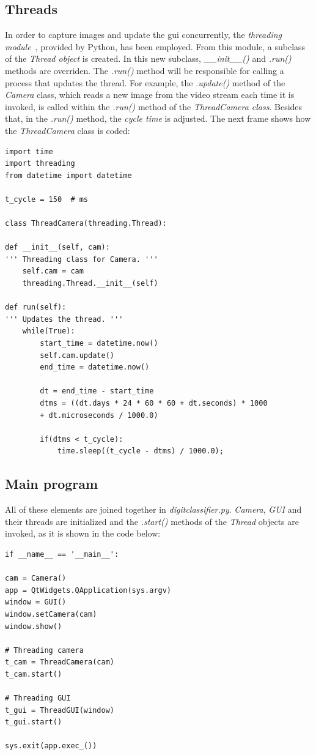 \subsection{Threads} 
In order to capture images and update the \gls{gui} concurrently, the \emph{\textit{threading} module}~\cite{threading}, provided by Python, has been employed. From this module, a subclass of the \emph{\textit{Thread} object} is created. In this new subclass, \textit{\_\_init\_\_()} and \textit{.run()} methods are overriden. The \textit{.run()} method will be responsible for calling a process that updates the thread. For example, the \textit{.update()} method of the \textit{Camera} class, which reads a new image from the video stream each time it is invoked, is called within the \textit{.run()} method of the \emph{\textit{ThreadCamera} class}. Besides that, in the \textit{.run()} method, the \emph{cycle time} is adjusted. The next frame shows how the \textit{ThreadCamera} class is coded:
\begin{lstlisting}
import time
import threading
from datetime import datetime

t_cycle = 150  # ms

class ThreadCamera(threading.Thread):

def __init__(self, cam):
''' Threading class for Camera. '''
	self.cam = cam
	threading.Thread.__init__(self)

def run(self):
''' Updates the thread. '''
	while(True):
		start_time = datetime.now()
		self.cam.update()
		end_time = datetime.now()
		
		dt = end_time - start_time
		dtms = ((dt.days * 24 * 60 * 60 + dt.seconds) * 1000
		+ dt.microseconds / 1000.0)
		
		if(dtms < t_cycle):
			time.sleep((t_cycle - dtms) / 1000.0);
\end{lstlisting}

\subsection{Main program}
All of these elements are joined together in \emph{\textit{digitclassifier.py}}. \textit{Camera}, \textit{GUI} and their threads are initialized and the \textit{.start()} methods of the \textit{Thread} objects are invoked, as it is shown in the code below:
\begin{lstlisting}
if __name__ == '__main__':

cam = Camera()
app = QtWidgets.QApplication(sys.argv)
window = GUI()
window.setCamera(cam)
window.show()

# Threading camera
t_cam = ThreadCamera(cam)
t_cam.start()

# Threading GUI
t_gui = ThreadGUI(window)
t_gui.start()

sys.exit(app.exec_())
\end{lstlisting}

